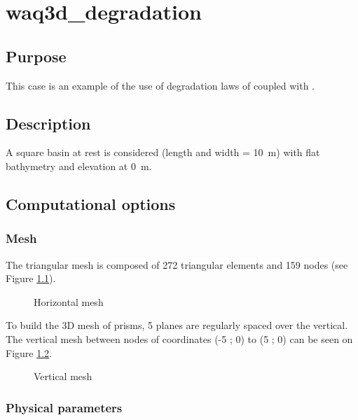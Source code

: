 \chapter{waq3d\_degradation}

\section{Purpose}

This case is an example of the use of degradation laws of \waqtel coupled with .

\section{Description}

A square basin at rest is considered (length and width = 10~m)
with flat bathymetry and elevation at 0~m.

\section{Computational options}

\subsection{Mesh}

The triangular mesh is composed of 272 triangular elements and 159 nodes
(see Figure \ref{fig:waq3d_degradation:mesh}).

\begin{figure}[H]
 \centering
\caption{Horizontal mesh}
 \label{fig:waq3d_degradation:mesh}
\end{figure}

To build the 3D mesh of prisms, 5 planes are regularly spaced over the vertical.
The vertical mesh between nodes of coordinates (-5 ; 0) to (5 ; 0) can be
seen on Figure \ref{fig:waq3d_degradation:mesh_section}.

\begin{figure}[H]
 \centering
\caption{Vertical mesh}
 \label{fig:waq3d_degradation:mesh_section}
\end{figure}

\subsection{Physical parameters}


